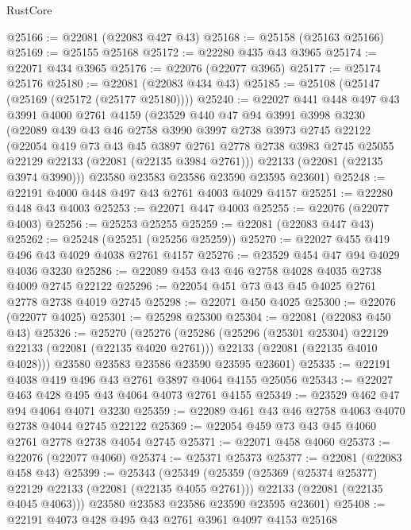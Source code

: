 \begin{lexlean}{RustCore}
\begin{coremodule}
@25166 := @22081 (@22083 @427 @43)
@25168 := @25158 (@25163 @25166)
@25169 := @25155 @25168
@25172 := @22280 @435 @43 @3965
@25174 := @22071 @434 @3965
@25176 := @22076 (@22077 @3965)
@25177 := @25174 @25176
@25180 := @22081 (@22083 @434 @43)
@25185 := @25108 (@25147 (@25169 (@25172 (@25177 @25180))))
@25240 := @22027
    @441
    @448
    @497
    @43
    @3991
    @4000
    @2761
    @4159
    (@23529
      @440
      @47
      @94
      @3991
      @3998
      @3230
      (@22089
        @439
        @43
        @46
        @2758
        @3990
        @3997
        @2738
        @3973
        @2745
        @22122
        (@22054
          @419
          @73
          @43
          @45
          @3897
          @2761
          @2778
          @2738
          @3983
          @2745
          @25055
          @22129
          @22133
          (@22081 (@22135 @3984 @2761)))
        @22133
        (@22081 (@22135 @3974 @3990)))
      @23580
      @23583
      @23586
      @23590
      @23595
      @23601)
@25248 := @22191 @4000 @448 @497 @43 @2761 @4003 @4029 @4157
@25251 := @22280 @448 @43 @4003
@25253 := @22071 @447 @4003
@25255 := @22076 (@22077 @4003)
@25256 := @25253 @25255
@25259 := @22081 (@22083 @447 @43)
@25262 := @25248 (@25251 (@25256 @25259))
@25270 := @22027 @455 @419 @496 @43 @4029 @4038 @2761 @4157
@25276 := @23529 @454 @47 @94 @4029 @4036 @3230
@25286 := @22089 @453 @43 @46 @2758 @4028 @4035 @2738 @4009 @2745 @22122
@25296 := @22054 @451 @73 @43 @45 @4025 @2761 @2778 @2738 @4019 @2745
@25298 := @22071 @450 @4025
@25300 := @22076 (@22077 @4025)
@25301 := @25298 @25300
@25304 := @22081 (@22083 @450 @43)
@25326 := @25270
    (@25276
      (@25286
        (@25296 (@25301 @25304) @22129 @22133 (@22081 (@22135 @4020 @2761)))
        @22133
        (@22081 (@22135 @4010 @4028)))
      @23580
      @23583
      @23586
      @23590
      @23595
      @23601)
@25335 := @22191 @4038 @419 @496 @43 @2761 @3897 @4064 @4155 @25056
@25343 := @22027 @463 @428 @495 @43 @4064 @4073 @2761 @4155
@25349 := @23529 @462 @47 @94 @4064 @4071 @3230
@25359 := @22089 @461 @43 @46 @2758 @4063 @4070 @2738 @4044 @2745 @22122
@25369 := @22054 @459 @73 @43 @45 @4060 @2761 @2778 @2738 @4054 @2745
@25371 := @22071 @458 @4060
@25373 := @22076 (@22077 @4060)
@25374 := @25371 @25373
@25377 := @22081 (@22083 @458 @43)
@25399 := @25343
    (@25349
      (@25359
        (@25369 (@25374 @25377) @22129 @22133 (@22081 (@22135 @4055 @2761)))
        @22133
        (@22081 (@22135 @4045 @4063)))
      @23580
      @23583
      @23586
      @23590
      @23595
      @23601)
@25408 := @22191 @4073 @428 @495 @43 @2761 @3961 @4097 @4153 @25168

\end{coremodule}
\end{lexlean}

